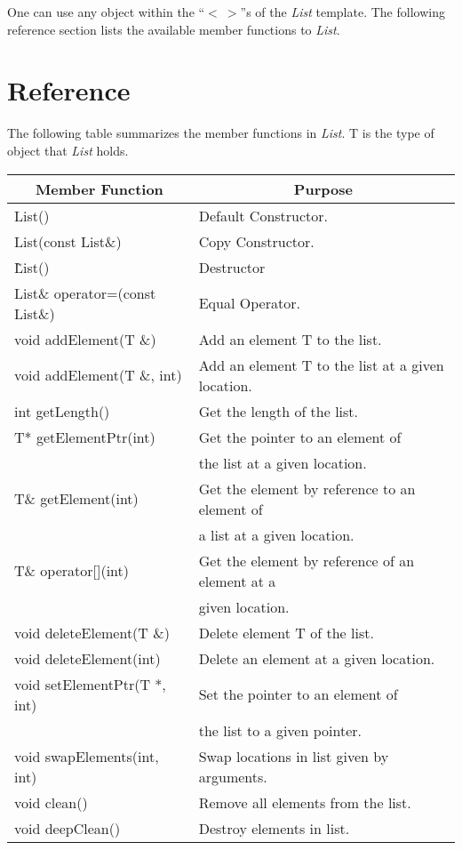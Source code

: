 One can use any object within the ``$<\ >$''s of the {\em List} template.  The following reference section lists the available member functions to {\em List}.

\section{Reference}

The following table summarizes the member functions in {\em List}.  T is the type of object that {\em List} holds.

\begin{center}
\begin{tabular}{|l|l|} \hline
\multicolumn{1}{|c|}{\bf Member Function} &  \multicolumn{1}{c|}{\bf Purpose} \\ \hline \hline
List() & Default Constructor. \\ \hline
List(const List\&) & Copy Constructor. \\ \hline
\~List() & Destructor \\ \hline
List\& operator=(const List\&) & Equal Operator. \\ \hline \hline
void addElement(T \&)  & Add an element T to the list.\\ \hline
void addElement(T \&, int)  & Add an element T to the list at a given location.\\ \hline
int getLength()  & Get the length of the list.\\ \hline
T* getElementPtr(int)  & Get the pointer to an element of \\
 & the list at a given location. \\ \hline
T\& getElement(int)  & Get the element by reference to an element of \\ 
 & a list at a given location.\\ \hline
T\& operator[](int)  & Get the element by reference of an element at a  \\
 & given location.\\ \hline
void deleteElement(T \&)  & Delete element T of the list.\\ \hline
void deleteElement(int)  & Delete an element at a given location.\\ \hline
void setElementPtr(T *, int)  & Set the pointer to an element of \\
 & the list to a given pointer. \\ \hline
void swapElements(int, int)  & Swap locations in list given by arguments.\\ \hline 
\hline
void clean()  & Remove all elements from the list.\\ \hline
void deepClean()  & Destroy elements in list.\\ \hline
\end{tabular}
\end{center}

